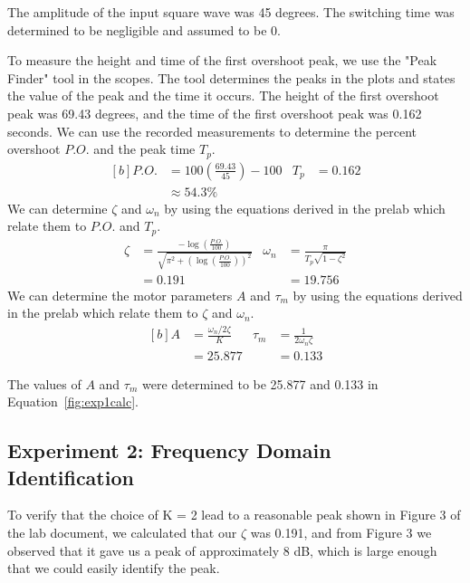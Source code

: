 \documentclass[12pt]{article}
\begin{document}
The amplitude of the input square wave was 45 degrees. The switching time was determined to be negligible and assumed to be 0.

To measure the height and time of the first overshoot peak, we use the "Peak Finder" tool in the scopes. The tool determines the peaks in the plots and states the value of the peak and the time it occurs. The height of the first overshoot peak was 69.43 degrees, and the time of the first overshoot peak was 0.162 seconds.
We can use the recorded measurements to determine the percent overshoot $P.O.$ and the peak time $T_p$.
\begin{equation*}
\begin{aligned}[b]
    P.O. &= 100\left(\frac{69.43}{45}\right) - 100 & T_p &= 0.162 \\
    &\approx 54.3\%
\end{aligned}
\end{equation*}
We can determine $\zeta$ and $\omega_n$ by using the equations derived in the prelab which relate them to $P.O.$ and $T_p$.
\begin{equation*}
\begin{aligned}
    \zeta &= \frac{-\log\left(\frac{P.O.}{100}\right)}{\sqrt{\pi^2 + \left(\log\left(\frac{P.O.}{100}\right)\right)^2}} & \omega_n &= \frac{\pi}{T_p\sqrt{1-\zeta^2}} \\
    &= 0.191 & &= 19.756
\end{aligned}
\end{equation*}
We can determine the motor parameters $A$ and $\tau_m$ by using the equations derived in the prelab which relate them to $\zeta$ and $\omega_n$.
\begin{equation} \label{fig:exp1calc}
\begin{aligned}[b]
    A &= \frac{\omega_n / 2\zeta}{K} & \tau_m &= \frac{1}{2\omega_n\zeta} \\
    &= 25.877 & &= 0.133
\end{aligned}
\end{equation}

The values of $A$ and $\tau_m$ were determined to be 25.877 and 0.133 in Equation~\ref{fig:exp1calc}.

\clearpage
\subsection{Experiment 2: Frequency Domain Identification}
To verify that the choice of K = 2 lead to a reasonable peak shown in Figure 3 of the lab document, we calculated that our $\zeta$ was 0.191, and from Figure 3 we observed that it gave us a peak of approximately 8 dB, which is large enough that we could easily identify the peak.
\end{document}
